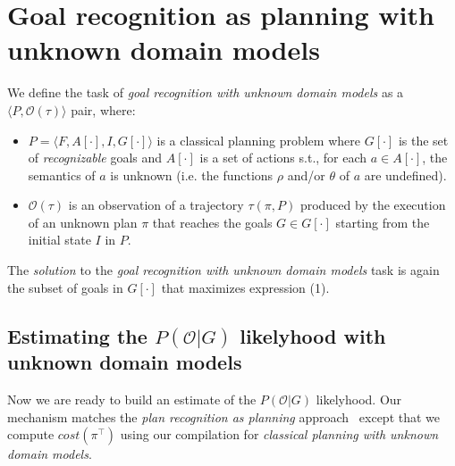 \documentclass{article}
\newcommand{\tup}[1]{{\langle #1 \rangle}}
\begin{document}
\section{Goal recognition as planning with unknown domain models}
\label{sec:recognition}

We define the task of {\em goal recognition with unknown domain models} as a $\tup{P,\mathcal{O}(\tau)}$ pair, where:
\begin{itemize}
\item $P=\tup{F,A[\cdot],I,G[\cdot]}$ is a classical planning problem where $G[\cdot]$ is the set of {\em recognizable} goals and $A[\cdot]$ is a set of actions s.t., for each $a\in A[\cdot]$, the semantics of $a$ is unknown (i.e. the functions $\rho$ and/or $\theta$ of $a$ are undefined).
\item $\mathcal{O}(\tau)$ is an observation of a trajectory $\tau(\pi,P)$ produced by the execution of an unknown plan $\pi$ that reaches the goals $G\in G[\cdot]$ starting from the initial state $I$ in $P$.
\end{itemize}

The {\em solution} to the {\em goal recognition with unknown domain models} task is again the subset of goals in $G[\cdot]$ that maximizes expression (1). 

\subsection{Estimating the $P(\mathcal{O}|G)$ likelyhood with unknown domain models}
Now we are ready to build an estimate of the $P(\mathcal{O}|G)$ likelyhood. Our mechanism matches the {\em plan recognition as planning} approach~\cite{ramirez2012plan} except that we compute $cost(\pi^\top)$ using our compilation for {\em classical planning with unknown domain models}.
\end{document}
